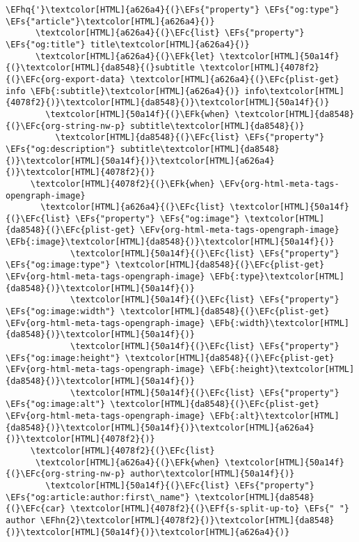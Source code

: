 \documentclass{scrartcl}
\newcommand{\EFk}[1]{\textcolor{EFk}{#1}} %
\newcommand{\EFs}[1]{\textcolor{EFs}{#1}} %
\newcommand{\EFb}[1]{\textcolor{EFb}{#1}} %
\newcommand{\EFc}[1]{\textcolor{EFc}{#1}} %
\newcommand{\EFv}[1]{\textcolor{EFv}{#1}} %
\newcommand{\EFf}[1]{\textcolor{EFf}{#1}} %
\newcommand{\EFhn}[1]{\textcolor{EFhn}{\textbf{#1}}} %
\newcommand{\EFhq}[1]{\textcolor{EFhq}{#1}} %
\begin{document}
\begin{Code}
\begin{Verbatim}[]
      \EFhq{'}\textcolor[HTML]{a626a4}{(}\EFs{"property"} \EFs{"og:type"} \EFs{"article"}\textcolor[HTML]{a626a4}{)}
      \textcolor[HTML]{a626a4}{(}\EFc{list} \EFs{"property"} \EFs{"og:title"} title\textcolor[HTML]{a626a4}{)}
      \textcolor[HTML]{a626a4}{(}\EFk{let} \textcolor[HTML]{50a14f}{(}\textcolor[HTML]{da8548}{(}subtitle \textcolor[HTML]{4078f2}{(}\EFc{org-export-data} \textcolor[HTML]{a626a4}{(}\EFc{plist-get} info \EFb{:subtitle}\textcolor[HTML]{a626a4}{)} info\textcolor[HTML]{4078f2}{)}\textcolor[HTML]{da8548}{)}\textcolor[HTML]{50a14f}{)}
        \textcolor[HTML]{50a14f}{(}\EFk{when} \textcolor[HTML]{da8548}{(}\EFc{org-string-nw-p} subtitle\textcolor[HTML]{da8548}{)}
          \textcolor[HTML]{da8548}{(}\EFc{list} \EFs{"property"} \EFs{"og:description"} subtitle\textcolor[HTML]{da8548}{)}\textcolor[HTML]{50a14f}{)}\textcolor[HTML]{a626a4}{)}\textcolor[HTML]{4078f2}{)}
     \textcolor[HTML]{4078f2}{(}\EFk{when} \EFv{org-html-meta-tags-opengraph-image}
       \textcolor[HTML]{a626a4}{(}\EFc{list} \textcolor[HTML]{50a14f}{(}\EFc{list} \EFs{"property"} \EFs{"og:image"} \textcolor[HTML]{da8548}{(}\EFc{plist-get} \EFv{org-html-meta-tags-opengraph-image} \EFb{:image}\textcolor[HTML]{da8548}{)}\textcolor[HTML]{50a14f}{)}
             \textcolor[HTML]{50a14f}{(}\EFc{list} \EFs{"property"} \EFs{"og:image:type"} \textcolor[HTML]{da8548}{(}\EFc{plist-get} \EFv{org-html-meta-tags-opengraph-image} \EFb{:type}\textcolor[HTML]{da8548}{)}\textcolor[HTML]{50a14f}{)}
             \textcolor[HTML]{50a14f}{(}\EFc{list} \EFs{"property"} \EFs{"og:image:width"} \textcolor[HTML]{da8548}{(}\EFc{plist-get} \EFv{org-html-meta-tags-opengraph-image} \EFb{:width}\textcolor[HTML]{da8548}{)}\textcolor[HTML]{50a14f}{)}
             \textcolor[HTML]{50a14f}{(}\EFc{list} \EFs{"property"} \EFs{"og:image:height"} \textcolor[HTML]{da8548}{(}\EFc{plist-get} \EFv{org-html-meta-tags-opengraph-image} \EFb{:height}\textcolor[HTML]{da8548}{)}\textcolor[HTML]{50a14f}{)}
             \textcolor[HTML]{50a14f}{(}\EFc{list} \EFs{"property"} \EFs{"og:image:alt"} \textcolor[HTML]{da8548}{(}\EFc{plist-get} \EFv{org-html-meta-tags-opengraph-image} \EFb{:alt}\textcolor[HTML]{da8548}{)}\textcolor[HTML]{50a14f}{)}\textcolor[HTML]{a626a4}{)}\textcolor[HTML]{4078f2}{)}
     \textcolor[HTML]{4078f2}{(}\EFc{list}
      \textcolor[HTML]{a626a4}{(}\EFk{when} \textcolor[HTML]{50a14f}{(}\EFc{org-string-nw-p} author\textcolor[HTML]{50a14f}{)}
        \textcolor[HTML]{50a14f}{(}\EFc{list} \EFs{"property"} \EFs{"og:article:author:first\_name"} \textcolor[HTML]{da8548}{(}\EFc{car} \textcolor[HTML]{4078f2}{(}\EFf{s-split-up-to} \EFs{" "} author \EFhn{2}\textcolor[HTML]{4078f2}{)}\textcolor[HTML]{da8548}{)}\textcolor[HTML]{50a14f}{)}\textcolor[HTML]{a626a4}{)}

\end{Verbatim}
\end{Code}
\end{document}

